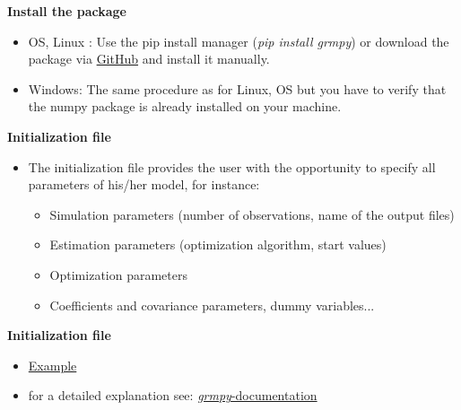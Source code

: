 \begin{frame}
\textbf{Install the package}

\medskip
\begin{itemize}\setlength\itemsep{1em}
\item OS, Linux : Use the pip install manager (\textit{pip install grmpy}) or download the package via \href{https://github.com/grmToolbox/grmpy}{GitHub} and install it manually.
\item Windows:  The same procedure as for Linux, OS but you have to verify that the numpy package is already installed on your machine.
\end{itemize}
\end{frame}

\begin{frame}
\textbf{Initialization file}

\medskip
\begin{itemize}\setlength\itemsep{1em}
\item The initialization file provides the user with the opportunity to specify all parameters of his/her model, for instance:\medskip
  \begin{itemize}\setlength\itemsep{1em}
  \item Simulation parameters (number of observations, name of the output files)
  \item Estimation parameters (optimization algorithm, start values)
  \item Optimization parameters
  \item Coefficients and covariance parameters, dummy variables...
  \end{itemize}
\end{itemize}
\end{frame}

\begin{frame}
\textbf{Initialization file}

\medskip
\begin{itemize}
\item \href{examples/tutorial.grmpy.ini}{Example}
\item for a detailed explanation see: \href{http://grmpy.readthedocs.io/en/latest/tutorial.html}{\textit{grmpy}-documentation}
\end{itemize}
\vfill
\end{frame}

